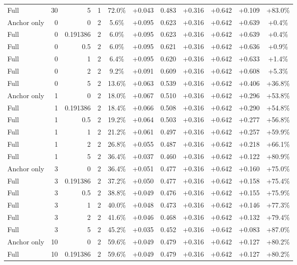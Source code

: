 \begin{table}[htbp]
\begin{tabular}{lrrrccccccc}
Full & 30 & 5 & 1 & 72.0\% & +0.043 & 0.483 & +0.316 & +0.642 & +0.109 & +83.0\% \\
Anchor only & 0 & 0 & 2 & 5.6\% & +0.095 & 0.623 & +0.316 & +0.642 & +0.639 & +0.4\% \\
Full & 0 & 0.191386 & 2 & 6.0\% & +0.095 & 0.623 & +0.316 & +0.642 & +0.639 & +0.4\% \\
Full & 0 & 0.5 & 2 & 6.0\% & +0.095 & 0.621 & +0.316 & +0.642 & +0.636 & +0.9\% \\
Full & 0 & 1 & 2 & 6.4\% & +0.095 & 0.620 & +0.316 & +0.642 & +0.633 & +1.4\% \\
Full & 0 & 2 & 2 & 9.2\% & +0.091 & 0.609 & +0.316 & +0.642 & +0.608 & +5.3\% \\
Full & 0 & 5 & 2 & 13.6\% & +0.063 & 0.539 & +0.316 & +0.642 & +0.406 & +36.8\% \\
Anchor only & 1 & 0 & 2 & 18.0\% & +0.067 & 0.510 & +0.316 & +0.642 & +0.296 & +53.8\% \\
Full & 1 & 0.191386 & 2 & 18.4\% & +0.066 & 0.508 & +0.316 & +0.642 & +0.290 & +54.8\% \\
Full & 1 & 0.5 & 2 & 19.2\% & +0.064 & 0.503 & +0.316 & +0.642 & +0.277 & +56.8\% \\
Full & 1 & 1 & 2 & 21.2\% & +0.061 & 0.497 & +0.316 & +0.642 & +0.257 & +59.9\% \\
Full & 1 & 2 & 2 & 26.8\% & +0.055 & 0.487 & +0.316 & +0.642 & +0.218 & +66.1\% \\
Full & 1 & 5 & 2 & 36.4\% & +0.037 & 0.460 & +0.316 & +0.642 & +0.122 & +80.9\% \\
Anchor only & 3 & 0 & 2 & 36.4\% & +0.051 & 0.477 & +0.316 & +0.642 & +0.160 & +75.0\% \\
Full & 3 & 0.191386 & 2 & 37.2\% & +0.050 & 0.477 & +0.316 & +0.642 & +0.158 & +75.4\% \\
Full & 3 & 0.5 & 2 & 38.8\% & +0.049 & 0.476 & +0.316 & +0.642 & +0.155 & +75.9\% \\
Full & 3 & 1 & 2 & 40.0\% & +0.048 & 0.473 & +0.316 & +0.642 & +0.146 & +77.3\% \\
Full & 3 & 2 & 2 & 41.6\% & +0.046 & 0.468 & +0.316 & +0.642 & +0.132 & +79.4\% \\
Full & 3 & 5 & 2 & 45.2\% & +0.035 & 0.452 & +0.316 & +0.642 & +0.083 & +87.0\% \\
Anchor only & 10 & 0 & 2 & 59.6\% & +0.049 & 0.479 & +0.316 & +0.642 & +0.127 & +80.2\% \\
Full & 10 & 0.191386 & 2 & 59.6\% & +0.049 & 0.479 & +0.316 & +0.642 & +0.127 & +80.2\% \\

\end{tabular}
\end{table}
